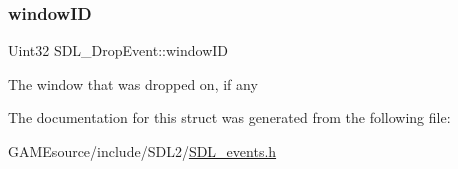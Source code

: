 \subsubsection{\texorpdfstring{window\+ID}{windowID}}
{\footnotesize\ttfamily Uint32 S\+D\+L\+\_\+\+Drop\+Event\+::window\+ID}

The window that was dropped on, if any 

The documentation for this struct was generated from the following file\+:\begin{DoxyCompactItemize}
\item 
G\+A\+M\+Esource/include/\+S\+D\+L2/\mbox{\hyperlink{_s_d_l__events_8h}{S\+D\+L\+\_\+events.\+h}}\end{DoxyCompactItemize}
